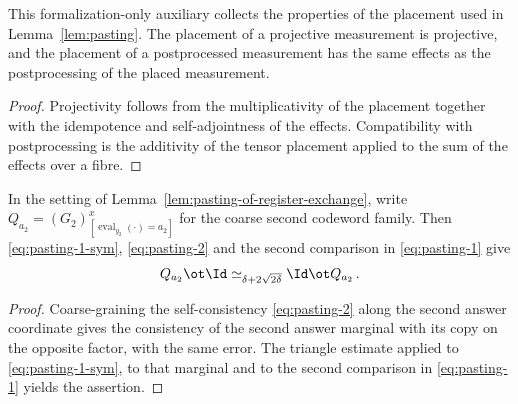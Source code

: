 \begin{lemma}
	\label{lem:pasting-tensor-placement}
	\leanok
	This formalization-only auxiliary collects the properties of the placement
	used in Lemma~\ref{lem:pasting}. The placement of a projective measurement is
	projective, and the placement of a postprocessed measurement has the same effects as the
	postprocessing of the placed measurement.
\end{lemma}
\begin{proof}
	\leanok
	Projectivity follows from the multiplicativity of the placement together
	with the idempotence and self-adjointness of the effects. Compatibility with
	postprocessing is the additivity of the tensor placement applied to the sum
	of the effects over a fibre.
\end{proof}

\begin{lemma}
	\label{lem:pasting-codeword-cross-consistency}
	\leanok
	In the setting of Lemma~\ref{lem:pasting-of-register-exchange}, write
	$Q_{a_2} = (G_2)^x_{[\operatorname{eval}_{y_2}(\cdot)=a_2]}$ for the coarse
	second codeword family. Then \eqref{eq:pasting-1-sym}, \eqref{eq:pasting-2}
	and the second comparison in \eqref{eq:pasting-1} give
	\[
		Q_{a_2} \ot \Id \simeq_{\delta + 2\sqrt{2\delta}} \Id \ot Q_{a_2}\,.
	\]
\end{lemma}
\begin{proof}
	\leanok
	Coarse-graining the self-consistency \eqref{eq:pasting-2} along the second
	answer coordinate gives the consistency of the second answer marginal with
	its copy on the opposite factor, with the same error. The triangle estimate
	applied to \eqref{eq:pasting-1-sym}, to that marginal and to the second
	comparison in \eqref{eq:pasting-1} yields the assertion.
\end{proof}


